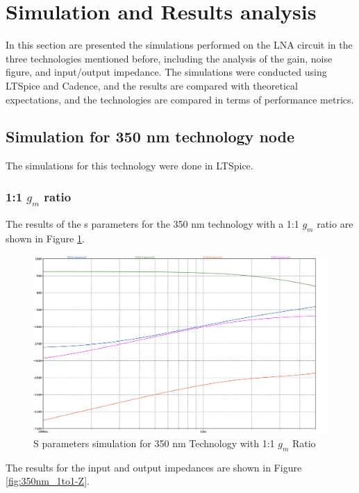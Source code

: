 \section{Simulation and Results analysis}

In this section are presented the simulations performed on the LNA circuit in the three technologies mentioned before, including the analysis of the gain, noise figure, and input/output impedance. The simulations were conducted using LTSpice and Cadence, and the results are compared with theoretical expectations, and the technologies are compared in terms of performance metrics. 

\subsection{Simulation for 350 nm technology node}

The simulations for this technology were done in LTSpice.
\subsubsection{1:1 $g_m$ ratio}

The results of the s parameters for the 350 nm technology with a 1:1 $g_m$ ratio are shown in Figure \ref{fig:350nm_1to1}. 
\begin{figure}[H]
    \centering
    \includegraphics[width=1\textwidth]{Images/3501to1SParam.png}
    \caption{S parameters simulation for 350 nm Technology with 1:1 $g_m$ Ratio}
    \label{fig:350nm_1to1}
\end{figure}

The results for the input and output impedances are shown in Figure \ref{fig:350nm_1to1-Z}.

